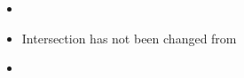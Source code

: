 
\begin{itemize}

    \item

\item
Intersection has not been changed from \cite{Eugene2001}

\item
\bracket[]

\end{itemize}